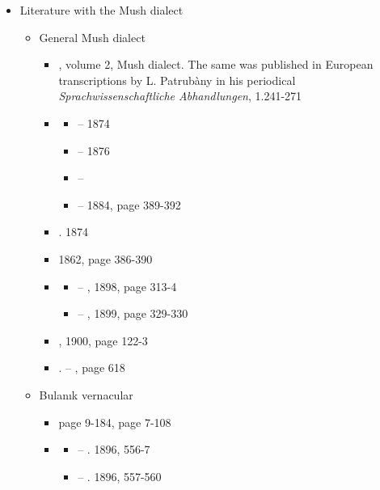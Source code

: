 \begin{itemize}
	\item Literature with the Mush dialect
	\begin{itemize}
		\item General Mush dialect 
		\begin{itemize}
			\item \citet{Patkanian-1875-RussianDialects}, volume 2, Mush dialect. The same was published in European transcriptions by L. Patrubàny in his periodical \textit{Sprachwissenschaftliche Abhandlungen}, 1.241-271
			\item {} 
			\begin{itemize}
				\item –  1874
				\item –  1876
				
				\begin{adjarianpage}\label{page:121}\end{adjarianpage}%
				
				\item – 
				\item –  1884, page 389-392
			\end{itemize}
			\item {}. 1874
			\item {} 1862, page 386-390
			\item {} 
			\begin{itemize}
				\item – , 1898, page 313-4
				\item – , 1899, page 329-330
			\end{itemize}
			\item {}, 1900, page 122-3
			\item {}. – , page 618
			
		\end{itemize}
		\item Bulanık vernacular
		\begin{itemize}
			\item {}page 9-184,  page 7-108
			\item {} 
			\begin{itemize}
				\item – . 1896, 556-7
				\item – . 1896, 557-560
			\end{itemize}
			

\end{itemize}
\end{itemize}
\end{itemize}
